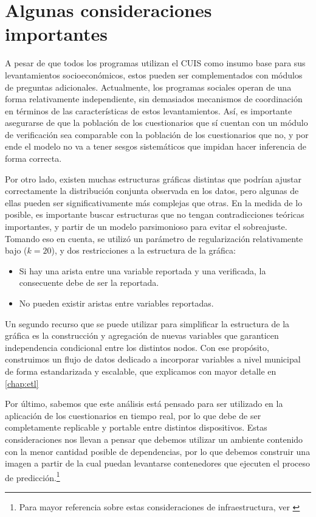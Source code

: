 \section*{Algunas consideraciones importantes}
A pesar de que todos los programas utilizan el CUIS como insumo base para sus levantamientos socioeconómicos, estos pueden ser complementados con módulos de preguntas adicionales. Actualmente, los programas sociales operan de una forma relativamente independiente, sin demasiados mecanismos de coordinación en términos de las características de estos levantamientos. Así, es importante asegurarse de que la población de los cuestionarios que sí cuentan con un módulo de verificación sea comparable con la población de los cuestionarios que no, y por ende el modelo no va a tener sesgos sistemáticos que impidan hacer inferencia de forma correcta.
\par
\noindent
Por otro lado, existen muchas estructuras gráficas distintas que podrían ajustar correctamente la distribución conjunta observada en los datos, pero algunas de ellas pueden ser significativamente más complejas que otras. En la medida de lo posible, es importante buscar estructuras que no tengan contradicciones teóricas importantes, y partir de un modelo parsimonioso para evitar el sobreajuste. Tomando eso en cuenta, se utilizó un parámetro de regularización relativamente bajo ($k=20$), y dos restricciones a la estructura de la gráfica:
\begin{itemize}
    \item Si hay una arista entre una variable reportada y una verificada, la consecuente debe de ser la reportada.
    \item No pueden existir aristas entre variables reportadas.
\end{itemize}
Un segundo recurso que se puede utilizar para simplificar la estructura de la gráfica es la construcción y agregación de nuevas variables que garanticen independencia condicional entre los distintos nodos. Con ese propósito, construimos un flujo de datos dedicado a incorporar variables a nivel municipal de forma estandarizada y escalable, que explicamos con mayor detalle en \autoref{chap:etl}
\par
\noindent
Por último, sabemos que este análisis está pensado para ser utilizado en la aplicación de los cuestionarios en tiempo real, por lo que debe de ser completamente replicable y portable entre distintos dispositivos. Estas consideraciones nos llevan a pensar que debemos utilizar un ambiente contenido con la menor cantidad posible de dependencias, por lo que debemos construir una imagen a partir de la cual puedan levantarse contenedores que ejecuten el proceso de predicción.\footnote{Para mayor referencia sobre estas consideraciones de infraestructura, ver \cite{docker}}

